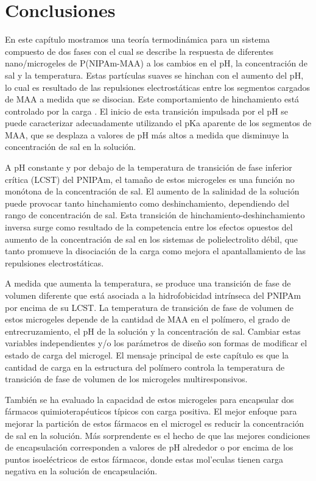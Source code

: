 \section{Conclusiones}

En este cap\'itulo mostramos una teor\'ia termodin\'amica  para un sistema compuesto de dos fases con el cual se describe la respuesta de diferentes nano/microgeles de P(NIPAm-MAA) a los cambios en el pH, la concentraci\'on de sal y la temperatura.
Estas part\'iculas suaves se hinchan con el aumento del pH, lo cual es resultado de las repulsiones electrost\'aticas entre los segmentos cargados de MAA a medida que se disocian.
Este comportamiento de hinchamiento est\'a controlado por la carga \cite{FernandezNieves2000}.
El inicio de esta transici\'on impulsada por el pH se puede caracterizar adecuadamente utilizando el pKa aparente de los segmentos de MAA, que se desplaza a valores de pH m\'as altos a medida que disminuye la concentraci\'on de sal en la soluci\'on.

A pH constante y por debajo de la temperatura de transici\'on de fase inferior cr\'itica (LCST) del PNIPAm, el tama\~no de estos microgeles es una funci\'on no mon\'otona de la concentraci\'on de sal.
El aumento de la salinidad de la soluci\'on puede provocar tanto hinchamiento como deshinchamiento, dependiendo del rango de concentraci\'on de sal.
Esta transici\'on de hinchamiento-deshinchamiento inversa surge como resultado de la competencia entre los efectos opuestos del aumento de la concentraci\'on de sal en los sistemas de polielectrolito d\'ebil, que tanto promueve la disociaci\'on de la carga como mejora el apantallamiento de las repulsiones electrost\'aticas.


A medida que aumenta la temperatura, se produce una transici\'on de fase de volumen diferente que est\'a asociada a la hidrofobicidad intr\'inseca del PNIPAm por encima de su LCST.
La temperatura de transici\'on de fase de volumen de estos microgeles depende de la cantidad de MAA en el pol\'imero, el grado de entrecruzamiento, el pH de la soluci\'on y la concentraci\'on de sal.
Cambiar estas variables independientes y/o los par\'ametros de dise\~no son formas de modificar el estado de carga del microgel.
El mensaje principal de este cap\'itulo es que la cantidad de carga en la estructura del pol\'imero controla la temperatura de transici\'on de fase de volumen de los microgeles multiresponsivos.

Tambi\'en se ha evaluado la capacidad de estos microgeles para encapsular dos f\'armacos quimioterap\'euticos t\'ipicos con carga positiva.
El mejor enfoque para mejorar la partici\'on de estos f\'armacos en el microgel es reducir la concentraci\'on de sal en la soluci\'on.
M\'as sorprendente es el hecho de que las mejores condiciones de encapsulaci\'on corresponden a valores de pH alrededor o por encima de los puntos isoel\'ectricos de estos f\'armacos, donde estas mol'eculas tienen carga negativa en la soluci\'on de encapsulaci\'on. 